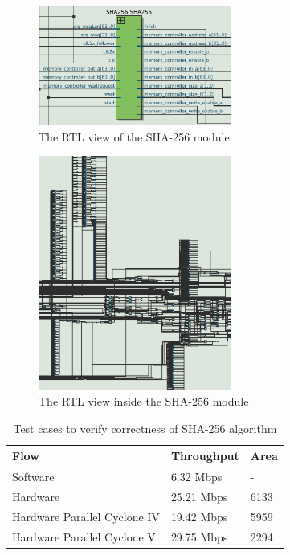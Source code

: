 \documentclass[conference]{IEEEtran}
\begin{document}
\begin{figure}[!t]
\centering
\includegraphics[width=2.5in]{sha256module}
\caption{The RTL view of the SHA-256 module}
\label{fig:sha256module}
\end{figure}

\begin{figure}[!t]
\centering
\includegraphics[width=2.5in]{rtlmess}
\caption{The RTL view inside the SHA-256 module}
\label{fig:rtlmess}
\end{figure}

	

\begin{table}
\begin{center}
	\caption{Test cases to verify correctness of SHA-256 algorithm}
    \begin{tabular}{| l | l | l |}
    \hline
    \label{tab:Legup}
    Flow 	 & Throughput & Area \\ \hline\hline
	Software & 6.32 Mbps & -  \\ \hline
	Hardware & 25.21 Mbps & 6133 \\ \hline
	Hardware Parallel Cyclone IV & 19.42 Mbps &  5959 \\ \hline
	Hardware Parallel Cyclone V & 29.75 Mbps &  2294 \\ \hline
	
    \hline 
    \end{tabular} 
\end{center}  
\end{table}
\end{document}

